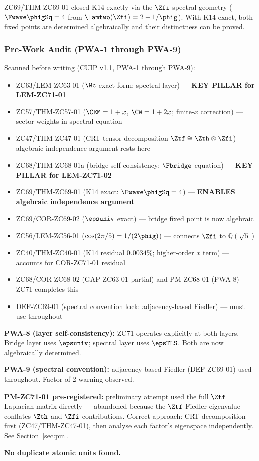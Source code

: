 \documentclass[12pt, a4paper]{article}
\begin{document}
ZC69/THM-ZC69-01 closed K14 exactly via the $\Zfi$ spectral
geometry ($\Fwave\phigSq = 4$ from $\lamtwo(\Zfi) = 2-1/\phig$).
With K14 exact, both fixed points are determined algebraically
and their distinctness can be proved.

\subsubsection{Pre-Work Audit (PWA-1 through PWA-9)}

\begin{formalbox}[title={Pre-Work Audit Record --- ZC71}]
Scanned before writing (CUIP v1.1, PWA-1 through PWA-9):
\begin{itemize}[leftmargin=2em, noitemsep]
  \item ZC63/LEM-ZC63-01 ($\Wc$ exact form; spectral layer)
    --- \textbf{KEY PILLAR for LEM-ZC71-01}
  \item ZC57/THM-ZC57-01 ($\CEM = 1+x$, $\CW = 1+2x$; finite-$x$ correction)
    --- sector weights in spectral equation
  \item ZC47/THM-ZC47-01 (CRT tensor decomposition $\Ztf \cong \Zth\otimes\Zfi$)
    --- algebraic independence argument rests here
  \item ZC68/THM-ZC68-01a (bridge self-consistency; $\Fbridge$ equation)
    --- \textbf{KEY PILLAR for LEM-ZC71-02}
  \item ZC69/THM-ZC69-01 (K14 exact: $\Fwave\phigSq = 4$)
    --- \textbf{ENABLES algebraic independence argument}
  \item ZC69/COR-ZC69-02 ($\epsuniv$ exact)
    --- bridge fixed point is now algebraic
  \item ZC56/LEM-ZC56-01 ($\cos(2\pi/5) = 1/(2\phig)$)
    --- connects $\Zfi$ to $\mathbb{Q}(\sqrt{5})$
  \item ZC40/THM-ZC40-01 (K14 residual $0.0034\%$; higher-order $x$ term)
    --- accounts for COR-ZC71-01 residual
  \item ZC68/COR-ZC68-02 (GAP-ZC63-01 partial) and PM-ZC68-01 (PWA-8)
    --- ZC71 completes this
  \item DEF-ZC69-01 (spectral convention lock: adjacency-based Fiedler)
    --- must use throughout
\end{itemize}

\textbf{PWA-8 (layer self-consistency):} ZC71 operates explicitly
at both layers. Bridge layer uses $\epsuniv$; spectral layer uses
$\epsTLS$. Both are now algebraically determined.

\textbf{PWA-9 (spectral convention):} adjacency-based Fiedler
(DEF-ZC69-01) used throughout. Factor-of-2 warning observed.

\textbf{PM-ZC71-01 pre-registered:} preliminary attempt used
the full $\Ztf$ Laplacian matrix directly --- abandoned because
the $\Ztf$ Fiedler eigenvalue conflates $\Zth$ and $\Zfi$
contributions. Correct approach: CRT decomposition first
(ZC47/THM-ZC47-01), then analyse each factor's eigenspace
independently. See Section~\ref{sec:pm}.

\textbf{No duplicate atomic units found.}
\end{formalbox}
\end{document}
